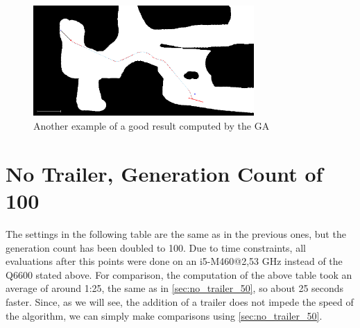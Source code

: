 \begin{figure}[b]
\centering
\includegraphics[width=0.75\textwidth]{./Chapters/Figures/example_good_path2.png}
\caption{Another example of a good result computed by the GA\label{pic:example_good_path2}}
\end{figure}


\section{No Trailer, Generation Count of 100}
\label{sec:no_trailer_100}

The settings in the following table are the same as in the previous ones, but the generation count has been doubled to 100.
Due to time constraints, all evaluations after this points were done on an i5-M460@2,53 GHz instead of the Q6600 stated above. For comparison, the computation of the above table took an average of around 1:25, the same as in \ref{sec:no_trailer_50}, so about 25 seconds faster. Since, as we will see, the addition of a trailer does not impede the speed of the algorithm, we can simply make comparisons using \ref{sec:no_trailer_50}.

